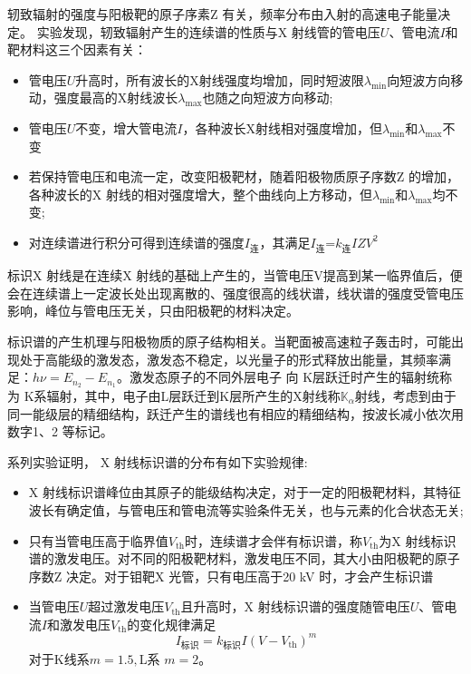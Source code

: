 \documentclass{whureport}
\begin{document}
\begin{multicols}{2}
	轫致辐射的强度与阳极靶的原子序素Z 有关，频率分布由入射的高速电子能量决定。 
	实验发现，轫致辐射产生的连续谱的性质与X 射线管的管电压$U$、管电流$I$和靶材料这三个因素有关：
	\begin{itemize}
		\item 管电压$U$升高时，所有波长的X射线强度均增加，同时短波限$\lambda_{\min}$向短波方向移动，强度最高的X射线波长$\lambda_{\max}$也随之向短波方向移动;
		\item 管电压$U$不变，增大管电流$I$，各种波长X射线相对强度增加，但$\lambda_{\min}$和$\lambda_{\max}$不变
		\item 若保持管电压和电流一定，改变阳极靶材，随着阳极物质原子序数Z 的增加，各种波长的X 射线的相对强度增大，整个曲线向上方移动，但$\lambda_{\min}$和$\lambda_{\max}$均不变;
		\item 对连续谱进行积分可得到连续谱的强度$I_{\text{连}}$，其满足$I_{\text{连}}$=$k_{\text{连}} IZV^2$
	\end{itemize}
	
	标识X 射线是在连续X 射线的基础上产生的，当管电压V提高到某一临界值后，便会在连续谱上一定波长处出现离散的、强度很高的线状谱，线状谱的强度受管电压影响，峰位与管电压无关，只由阳极靶的材料决定。
	
	标识谱的产生机理与阳极物质的原子结构相关。当靶面被高速粒子轰击时，可能出现处于高能级的激发态，激发态不稳定，以光量子的形式释放出能量，其频率满足：$h\nu=E_{n_2}-E_{n_1}$。激发态原子的不同外层电子 向 K层跃迁时产生的辐射统称为 K系辐射，其中，电子由L层跃迁到K层所产生的X射线称$\mathbb{K}_\alpha$射线，考虑到由于同一能级层的精细结构，跃迁产生的谱线也有相应的精细结构，按波长减小依次用数字1、2 等标记。
	
	系列实验证明， X 射线标识谱的分布有如下实验规律:
	\begin{itemize}
		\item X 射线标识谱峰位由其原子的能级结构决定，对于一定的阳极靶材料，其特征波长有确定值，与管电压和管电流等实验条件无关，也与元素的化合状态无关;
		\item 只有当管电压高于临界值$V_{\text{th}}$时，连续谱才会伴有标识谱，称$V_{\text{th}}$为X 射线标识谱的激发电压。对不同的阳极靶材料，激发电压不同，其大小由阳极靶的原子序数Z 决定。对于钼靶X 光管，只有电压高于20 kV 时，才会产生标识谱
		\item 当管电压$U$超过激发电压$V_{\text{th}}$且升高时，X 射线标识谱的强度随管电压$U$、管电流$I$和激发电压$V_{\text{th}}$的变化规律满足
		\begin{equation}
			I_{\text{标识}}=k_{\text{标识}}I(V-V_{\text{th}})^m
		\end{equation}
		对于K线系$m=1.5,$L系 $m=2$。
	\end{itemize}

\end{multicols}
\end{document}
